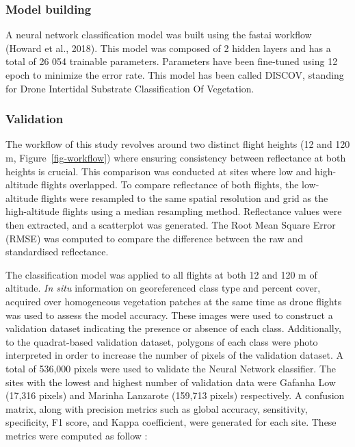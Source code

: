 \documentclass[
  letterpaper,
  11pt,
  english,
  singlespacing,
  headsepline]{MastersDoctoralThesis}
\begin{document}
\begin{spacing}{1.5}
\subsubsection{Model building}\label{model-building}

A neural network classification model was built using the fastai
workflow (Howard et al., 2018). This model was composed of 2 hidden
layers and has a total of 26 054 trainable parameters. Parameters have
been fine-tuned using 12 epoch to minimize the error rate. This model
has been called DISCOV, standing for Drone Intertidal Substrate
Classification Of Vegetation.

\subsubsection{Validation}\label{validation}

The workflow of this study revolves around two distinct flight heights
(12 and 120 m, Figure~\ref{fig-workflow}) where ensuring consistency
between reflectance at both heights is crucial. This comparison was
conducted at sites where low and high-altitude flights overlapped. To
compare reflectance of both flights, the low-altitude flights were
resampled to the same spatial resolution and grid as the high-altitude
flights using a median resampling method. Reflectance values were then
extracted, and a scatterplot was generated. The Root Mean Square Error
(RMSE) was computed to compare the difference between the raw and
standardised reflectance.

The classification model was applied to all flights at both 12 and 120 m
of altitude. \emph{In situ} information on georeferenced class type and
percent cover, acquired over homogeneous vegetation patches at the same
time as drone flights was used to assess the model accuracy. These
images were used to construct a validation dataset indicating the
presence or absence of each class. Additionally, to the quadrat-based
validation dataset, polygons of each class were photo interpreted in
order to increase the number of pixels of the validation dataset. A
total of 536,000 pixels were used to validate the Neural Network
classifier. The sites with the lowest and highest number of validation
data were Gafanha Low (17,316 pixels) and Marinha Lanzarote (159,713
pixels) respectively. A confusion matrix, along with precision metrics
such as global accuracy, sensitivity, specificity, F1 score, and Kappa
coefficient, were generated for each site. These metrics were computed
as follow :


\end{spacing}
\end{document}

